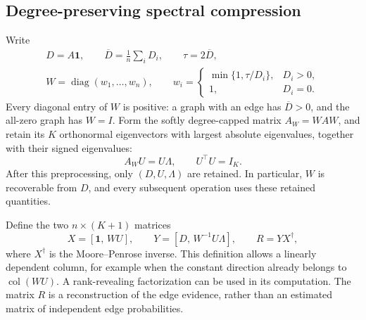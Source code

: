 \documentclass[11pt]{article}
\theoremstyle{definition}
\theoremstyle{remark}
\newcommand{\one}{\mathbf 1}
\newcommand{\diag}{\operatorname{diag}}
\numberwithin{equation}{section}
\begin{document}
\subsection{Degree-preserving spectral compression}
Write
\begin{equation}
 \begin{aligned}
 D=A\one,\qquad \overline D=\frac1n\sum_iD_i,\qquad
 \tau=2\overline D,\\
 W=\diag(w_1,\ldots,w_n),\qquad
 w_i=\begin{cases}
 \min\{1,\tau/D_i\},&D_i>0,\\
 1,&D_i=0.
 \end{cases}
 \end{aligned}
 \label{eq:degree-regularization}
\end{equation}
Every diagonal entry of $W$ is positive: a graph with an edge has
$\overline D>0$, and the all-zero graph has $W=I$. Form the softly
degree-capped matrix $A_W=WAW$, and retain its $K$ orthonormal eigenvectors
with largest absolute eigenvalues, together with their signed eigenvalues:
\begin{equation}
 A_WU=U\Lambda,\qquad U^\top U=I_K.
 \label{eq:general-eigenpairs}
\end{equation}
After this preprocessing, only $(D,U,\Lambda)$ are retained. In particular,
$W$ is recoverable from $D$, and every subsequent operation uses these
retained quantities.

Define the two $n\times(K+1)$ matrices
\begin{equation}
 X=[\one,\,WU],\qquad
 Y=[D,\,W^{-1}U\Lambda],\qquad
 R=YX^\dagger,
 \label{eq:general-reconstruction}
\end{equation}
where $X^\dagger$ is the Moore--Penrose inverse. This definition allows a
linearly dependent column, for example when the constant direction already
belongs to $\operatorname{col}(WU)$. A rank-revealing factorization can be
used in its computation. The matrix $R$ is a reconstruction of the edge
evidence, rather than an estimated matrix of independent edge probabilities.
\end{document}
